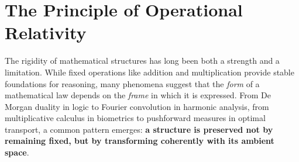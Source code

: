 \documentclass[11pt,a4paper,openany]{book}
\theoremstyle{plain}
\theoremstyle{definition}
\begin{document}
\section{The Principle of Operational Relativity}

The rigidity of mathematical structures has long been both a strength and a limitation. While fixed operations like addition and multiplication provide stable foundations for reasoning, many phenomena suggest that the \emph{form} of a mathematical law depends on the \emph{frame} in which it is expressed. From De Morgan duality in logic to Fourier convolution in harmonic analysis, from multiplicative calculus in biometrics to pushforward measures in optimal transport, a common pattern emerges: \textbf{a structure is preserved not by remaining fixed, but by transforming coherently with its ambient space}.
\end{document}
